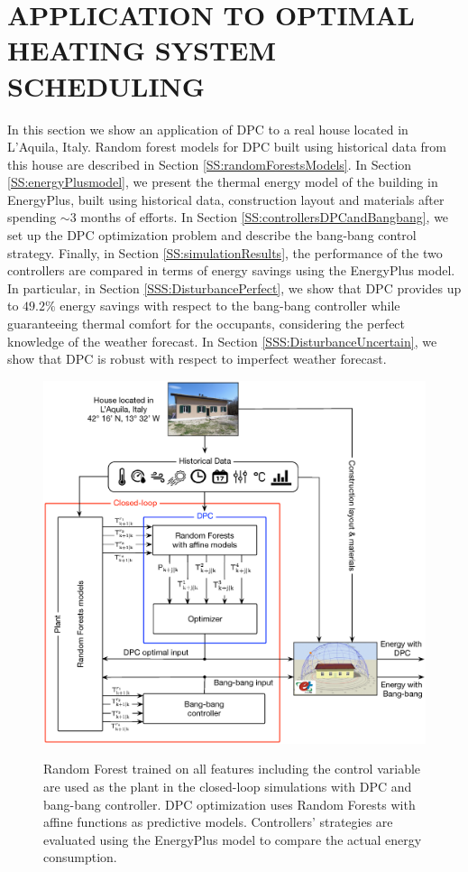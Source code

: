 \section{APPLICATION TO OPTIMAL HEATING SYSTEM SCHEDULING}
\label{S:realCaseStudy}

In this section we show an application of DPC to a real house located in L'Aquila, Italy. Random forest models for DPC built using historical data from this house are described in Section \ref{SS:randomForestsModels}. 
In Section \ref{SS:energyPlusmodel}, we present the thermal energy model of the building in EnergyPlus, built using historical data, construction layout and materials after spending $\sim3$ months of efforts.
In Section \ref{SS:controllersDPCandBangbang}, we set up the DPC optimization problem and describe the bang-bang control strategy.
Finally, in Section \ref{SS:simulationResults}, the performance of the two controllers are compared in terms of energy savings using the EnergyPlus model.
\textcolor[rgb]{0,0,1}{In particular, in Section \ref{SSS:DisturbancePerfect}, we show that DPC provides up to $49.2\%$ energy savings with respect to the bang-bang controller while guaranteeing thermal comfort for the occupants, considering the perfect knowledge of the weather forecast. 
In Section \ref{SSS:DisturbanceUncertain}, we show that DPC is robust with respect to imperfect weather forecast.}
\begin{figure}[h!]
	\begin{center}
		\includegraphics[width=1\linewidth]{figures/overview.eps}
		\caption{Random Forest trained on all features including the control variable are used as the plant in the closed-loop simulations with DPC and bang-bang controller. DPC optimization uses Random Forests with affine functions as predictive models. Controllers' strategies are evaluated using the EnergyPlus model to compare the actual energy consumption.}
		\captionsetup{justification=centering}
		\label{F:overview}
	\end{center}
\end{figure}

